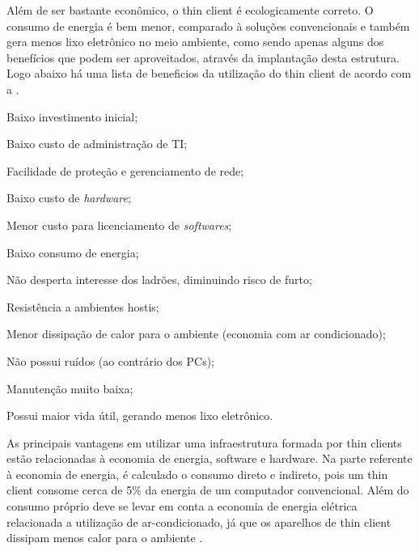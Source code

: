 \documentclass[
	12pt,				%
	openright,			%
	twoside,			%
	a4paper,			%
	chapter=TITLE,		%
	english,			%
	brazil				%
	]{abntex2}
\begin{document}
Além de ser bastante econômico, o thin client é ecologicamente correto. O consumo de energia é bem menor, comparado à soluções convencionais e também gera menos lixo eletrônico no meio ambiente, como sendo apenas alguns dos benefícios que podem ser aproveitados, através da implantação desta estrutura. Logo abaixo há uma lista de beneficios da utilização do thin client de acordo com a .

\begin{alineas}
\item Baixo investimento inicial;
\item Baixo custo de administração de TI;
\item Facilidade de proteção e gerenciamento de rede;
\item Baixo custo de \textit{hardware};
\item Menor custo para licenciamento de \textit{softwares};
\item Baixo consumo de energia;
\item Não desperta interesse dos ladrões, diminuindo risco de furto;
\item Resistência a ambientes hostis;
\item Menor dissipação de calor para o ambiente (economia com ar condicionado);
\item Não possui ruídos (ao contrário dos PCs);
\item Manutenção muito baixa;
\item Possui maior vida útil, gerando menos lixo eletrônico.
\end{alineas}

As principais vantagens em utilizar uma infraestrutura formada por thin clients estão relacionadas à economia de energia, software e hardware. Na parte referente à economia de energia, é calculado o consumo direto e indireto, pois um thin client consome cerca de 5\% da energia de um computador convencional. Além do consumo próprio deve se levar em conta a economia de energia elétrica relacionada a utilização de ar-condicionado, já que os aparelhos de thin client dissipam menos calor para o ambiente \cite{EmailThinClient}.
	 

\begin{table}[h!]
\end{table}
\end{document}
